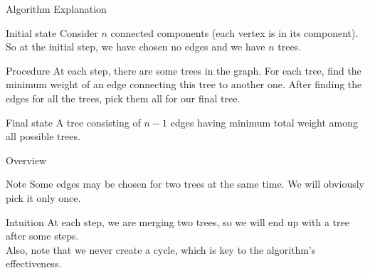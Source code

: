 \documentclass[
	11pt, %
]{beamer}
\begin{document}
\begin{frame}{Algorithm Explanation}
    \begin{beamerboxesrounded}[shadow=true]{Initial state}
        Consider $n$ connected components (each vertex is in its component). So at the initial step, we have chosen no edges and we have $n$ trees.
    \end{beamerboxesrounded}

    \vspace*{0.6cm}    
    \begin{beamerboxesrounded}[shadow=true]{Procedure}
        At each step, there are some trees in the graph.
        For each tree, find the minimum weight of an edge connecting this tree to another one.
        After finding the edges for all the trees, pick them all for our final tree. 
    \end{beamerboxesrounded}

    \vspace*{0.6cm}
    \begin{beamerboxesrounded}[shadow=true]{Final state}
        A tree consisting of $n - 1$ edges having minimum total weight among all possible trees.
    \end{beamerboxesrounded}
\end{frame}

\begin{frame}{Overview}
    \begin{beamerboxesrounded}[shadow=true]{Note}
        Some edges may be chosen for two trees at the same time. We will obviously pick it only once.
    \end{beamerboxesrounded}

    \vspace*{0.5cm}

    \begin{beamerboxesrounded}[shadow=true]{Intuition}
        At each step, we are merging two trees, so we will end up with a tree after some steps.
        \\
        Also, note that we never create a cycle, which is key to the algorithm's effectiveness.
    \end{beamerboxesrounded}
\end{frame}
\end{document}
